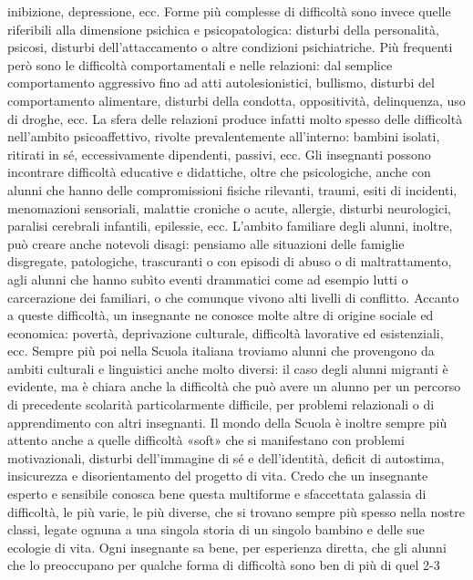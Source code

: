 inibizione, depressione, ecc. Forme più complesse di difficoltà sono invece quelle riferibili alla
dimensione  psichica  e  psicopatologica:  disturbi  della  personalità,  psicosi,  disturbi
dell’attaccamento o altre condizioni psichiatriche.
Più frequenti però sono le difficoltà comportamentali e nelle relazioni: dal semplice
comportamento aggressivo fino ad atti autolesionistici, bullismo, disturbi del comportamento
alimentare, disturbi della condotta, oppositività, delinquenza, uso di droghe, ecc. La sfera delle
relazioni produce infatti molto spesso delle difficoltà nell’ambito psicoaffettivo, rivolte
prevalentemente all’interno: bambini isolati, ritirati in sé, eccessivamente dipendenti, passivi, ecc.
Gli insegnanti possono incontrare difficoltà educative e didattiche, oltre che psicologiche,
anche con alunni che hanno delle compromissioni fisiche rilevanti, traumi, esiti di incidenti,
menomazioni sensoriali, malattie croniche o acute, allergie, disturbi neurologici, paralisi cerebrali
infantili, epilessie, ecc.
L’ambito familiare degli alunni, inoltre, può creare anche notevoli disagi: pensiamo alle
situazioni delle famiglie disgregate, patologiche, trascuranti o con episodi di abuso o di
maltrattamento, agli alunni che hanno subìto eventi drammatici come ad esempio lutti o
carcerazione dei familiari, o che comunque vivono alti livelli di conflitto.
Accanto a queste difficoltà, un insegnante ne conosce molte altre di origine sociale ed
economica: povertà, deprivazione culturale, difficoltà lavorative ed esistenziali, ecc. Sempre più poi
nella Scuola italiana troviamo alunni che provengono da ambiti culturali e linguistici anche molto
diversi: il caso degli alunni migranti è evidente, ma è chiara anche la difficoltà che può avere un
alunno per un percorso di precedente scolarità particolarmente difficile, per problemi relazionali o
di apprendimento con altri insegnanti.
Il mondo della Scuola è inoltre sempre più attento anche a quelle difficoltà «soft» che si
manifestano con problemi motivazionali, disturbi dell’immagine di sé e dell’identità, deficit di
autostima, insicurezza e disorientamento del progetto di vita. Credo che un insegnante esperto e
sensibile conosca bene questa multiforme e sfaccettata galassia di difficoltà, le più varie, le più
diverse, che si trovano sempre più spesso nella nostre classi, legate ognuna a una singola storia di
un singolo bambino e delle sue ecologie di vita.
Ogni insegnante sa bene, per esperienza diretta, che gli alunni che lo preoccupano per
qualche forma di difficoltà sono ben di più di quel 2-3%
